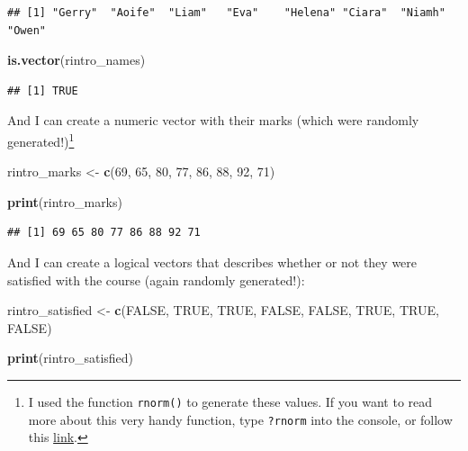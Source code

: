 \documentclass[
]{book}
\newenvironment{Shaded}{\begin{snugshade}}{\end{snugshade}}
\newcommand{\ConstantTok}[1]{\textcolor[rgb]{0.56,0.35,0.01}{#1}}
\newcommand{\DecValTok}[1]{\textcolor[rgb]{0.00,0.00,0.81}{#1}}
\newcommand{\FunctionTok}[1]{\textcolor[rgb]{0.13,0.29,0.53}{\textbf{#1}}}
\newcommand{\NormalTok}[1]{#1}
\newcommand{\OtherTok}[1]{\textcolor[rgb]{0.56,0.35,0.01}{#1}}
\begin{document}
\begin{verbatim}
## [1] "Gerry"  "Aoife"  "Liam"   "Eva"    "Helena" "Ciara"  "Niamh"  "Owen"
\end{verbatim}

\begin{Shaded}
\begin{Highlighting}[]
\FunctionTok{is.vector}\NormalTok{(rintro\_names) }
\end{Highlighting}
\end{Shaded}

\begin{verbatim}
## [1] TRUE
\end{verbatim}

And I can create a numeric vector with their marks (which were randomly generated!)\footnote{I used the function \texttt{rnorm()} to generate these values. If you want to read more about this very handy function, type \texttt{?rnorm} into the console, or follow this \href{https://www.statology.org/r-runif-vs-rnorm/}{link}.}

\begin{Shaded}
\begin{Highlighting}[]
\NormalTok{rintro\_marks }\OtherTok{\textless{}{-}} \FunctionTok{c}\NormalTok{(}\DecValTok{69}\NormalTok{, }\DecValTok{65}\NormalTok{, }\DecValTok{80}\NormalTok{, }\DecValTok{77}\NormalTok{, }\DecValTok{86}\NormalTok{, }\DecValTok{88}\NormalTok{, }\DecValTok{92}\NormalTok{, }\DecValTok{71}\NormalTok{)}

\FunctionTok{print}\NormalTok{(rintro\_marks)}
\end{Highlighting}
\end{Shaded}

\begin{verbatim}
## [1] 69 65 80 77 86 88 92 71
\end{verbatim}

And I can create a logical vectors that describes whether or not they were satisfied with the course (again randomly generated!):

\begin{Shaded}
\begin{Highlighting}[]
\NormalTok{rintro\_satisfied }\OtherTok{\textless{}{-}} \FunctionTok{c}\NormalTok{(}\ConstantTok{FALSE}\NormalTok{, }\ConstantTok{TRUE}\NormalTok{, }\ConstantTok{TRUE}\NormalTok{, }\ConstantTok{FALSE}\NormalTok{, }\ConstantTok{FALSE}\NormalTok{, }\ConstantTok{TRUE}\NormalTok{, }\ConstantTok{TRUE}\NormalTok{, }\ConstantTok{FALSE}\NormalTok{) }

\FunctionTok{print}\NormalTok{(rintro\_satisfied)}
\end{Highlighting}
\end{Shaded}
\end{document}
